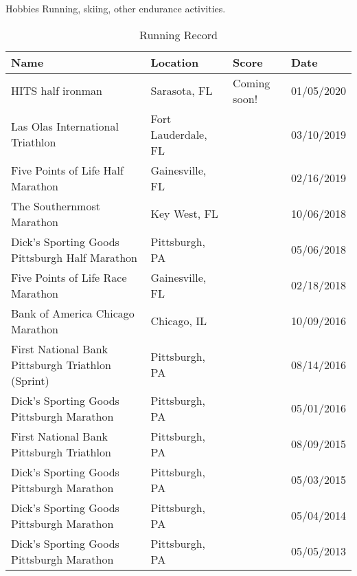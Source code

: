 \documentclass{resume} %
\begin{document}
\begin{rSection}{Hobbies}
Running, skiing, other endurance activities.

\begin{table}[htp]
\caption*{Running Record}
\begin{center}
\begin{tabular}{l l l l}
\hline
\hline
Name & Location & Score & Date \\
\hline
HITS half ironman & Sarasota, FL & Coming soon!  & 01/05/2020 \\
Las Olas International Triathlon & Fort Lauderdale, FL & &  {03/10/2019} \\
Five Points of Life Half Marathon & Gainesville, FL & &  {02/16/2019} \\
The Southernmost Marathon & Key West, FL & &  {10/06/2018}\\
Dick's Sporting Goods Pittsburgh Half Marathon & Pittsburgh, PA & &  {05/06/2018}\\
Five Points of Life Race Marathon & Gainesville, FL&  & {02/18/2018}\\
Bank of America Chicago Marathon & Chicago, IL&  & {10/09/2016}\\
First National Bank Pittsburgh Triathlon (Sprint) & Pittsburgh, PA &  & {08/14/2016}\\
Dick's Sporting Goods Pittsburgh Marathon & Pittsburgh, PA&  & {05/01/2016} \\
First National Bank Pittsburgh Triathlon & Pittsburgh, PA & &  {08/09/2015}\\
Dick's Sporting Goods Pittsburgh Marathon & {Pittsburgh, PA} &  & {05/03/2015}\\
Dick's Sporting Goods Pittsburgh Marathon & {Pittsburgh, PA} &  &  {{05/04/2014}}\\
Dick's Sporting Goods Pittsburgh Marathon & {Pittsburgh, PA} & &   {05/05/2013}\\
\hline
\hline
\end{tabular}
\end{center}
\label{default}
\end{table}%


\end{rSection}






\end{document}
